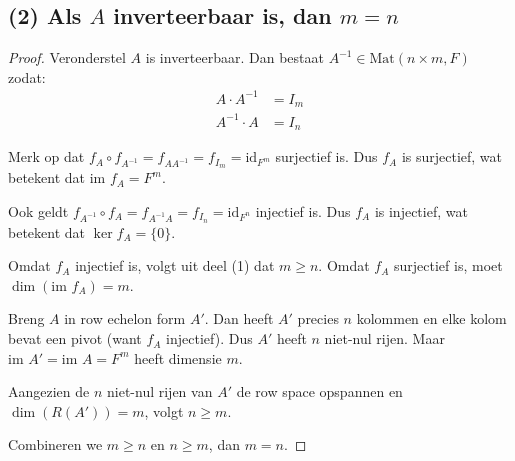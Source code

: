\documentclass{article}
\begin{document}
\subsection*{(2) Als $A$ inverteerbaar is, dan $m = n$}
\begin{proof}
    Veronderstel $A$ is inverteerbaar. Dan bestaat $A^{-1} \in \text{Mat}(n \times m, F)$ zodat:
    \begin{align*}
        A \cdot A^{-1} & = I_m \\
        A^{-1} \cdot A & = I_n
    \end{align*}

    Merk op dat $f_A \circ f_{A^{-1}} = f_{AA^{-1}} = f_{I_m} = \text{id}_{F^m}$ surjectief is.
    Dus $f_A$ is surjectief, wat betekent dat $\text{im } f_A = F^m$.

    Ook geldt $f_{A^{-1}} \circ f_A = f_{A^{-1}A} = f_{I_n} = \text{id}_{F^n}$ injectief is.
    Dus $f_A$ is injectief, wat betekent dat $\ker f_A = \{0\}$.

    Omdat $f_A$ injectief is, volgt uit deel (1) dat $m \geq n$.
    Omdat $f_A$ surjectief is, moet $\dim(\text{im } f_A) = m$.

    Breng $A$ in row echelon form $A'$. Dan heeft $A'$ precies $n$ kolommen en elke kolom bevat een pivot (want $f_A$ injectief).
    Dus $A'$ heeft $n$ niet-nul rijen. Maar $\text{im } A' = \text{im } A = F^m$ heeft dimensie $m$.

    Aangezien de $n$ niet-nul rijen van $A'$ de row space opspannen en $\dim(R(A')) = m$, volgt $n \geq m$.

    Combineren we $m \geq n$ en $n \geq m$, dan $m = n$.
\end{proof}
\end{document}

